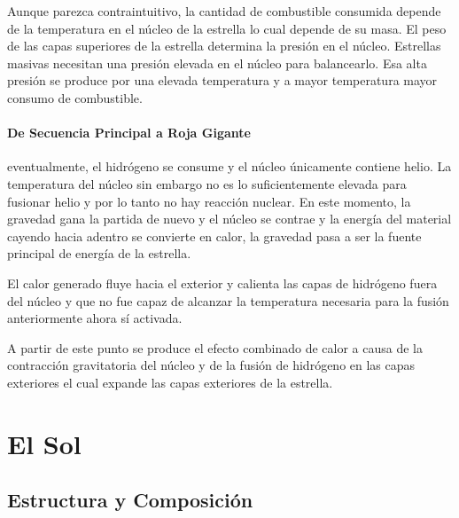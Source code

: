 \documentclass{tufte-handout}
\begin{document}

Aunque parezca contraintuitivo, la cantidad de combustible consumida depende de la temperatura en el núcleo de la estrella lo cual depende de su masa. El peso de las capas superiores de la estrella determina la presión en el núcleo. Estrellas masivas necesitan una presión elevada en el núcleo para balancearlo. Esa alta presión se produce por una elevada temperatura y a mayor temperatura mayor consumo de combustible.

\paragraph{De Secuencia Principal a Roja Gigante} eventualmente, el hidrógeno se consume y el núcleo únicamente contiene helio. La temperatura del núcleo sin embargo no es lo suficientemente elevada para fusionar helio y por lo tanto no hay reacción nuclear. En este momento, la gravedad gana la partida de nuevo y el núcleo se contrae y la energía del material cayendo hacia adentro se convierte en calor, la gravedad pasa a ser la fuente principal de energía de la estrella.

El calor generado fluye hacia el exterior y calienta las capas de hidrógeno fuera del núcleo y que no fue capaz de alcanzar la temperatura necesaria para la fusión anteriormente ahora sí activada.


A partir de este punto se produce el efecto combinado de calor a causa de la contracción gravitatoria del núcleo y de la fusión de hidrógeno en las capas exteriores el cual expande las capas exteriores de la estrella.


\clearpage

\section{El Sol}

\subsection{Estructura y Composición}
\end{document}

